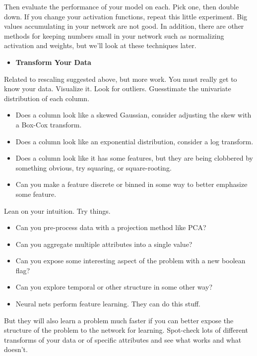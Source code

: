 \documentclass[11pt]{article}
\providecommand{\tightlist}{%
      \setlength{\itemsep}{0pt}\setlength{\parskip}{0pt}}
\begin{document}
Then evaluate the performance of your model on each. Pick one, then
double down. If you change your activation functions, repeat this little
experiment. Big values accumulating in your network are not good. In
addition, there are other methods for keeping numbers small in your
network such as normalizing activation and weights, but we'll look at
these techniques later.

\begin{itemize}
\tightlist
\item
  \textbf{Transform Your Data}
\end{itemize}

Related to rescaling suggested above, but more work. You must really get
to know your data. Visualize it. Look for outliers. Guesstimate the
univariate distribution of each column.

\begin{itemize}
\tightlist
\item
  Does a column look like a skewed Gaussian, consider adjusting the skew
  with a Box-Cox transform.
\item
  Does a column look like an exponential distribution, consider a log
  transform.
\item
  Does a column look like it has some features, but they are being
  clobbered by something obvious, try squaring, or square-rooting.
\item
  Can you make a feature discrete or binned in some way to better
  emphasize some feature.
\end{itemize}

Lean on your intuition. Try things.

\begin{itemize}
\tightlist
\item
  Can you pre-process data with a projection method like PCA?
\item
  Can you aggregate multiple attributes into a single value?
\item
  Can you expose some interesting aspect of the problem with a new
  boolean flag?
\item
  Can you explore temporal or other structure in some other way?
\item
  Neural nets perform feature learning. They can do this stuff.
\end{itemize}

But they will also learn a problem much faster if you can better expose
the structure of the problem to the network for learning. Spot-check
lots of different transforms of your data or of specific attributes and
see what works and what doesn't.
\end{document}
